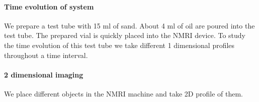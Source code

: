 \paragraph{Time evolution of system}
We prepare a test tube with 15 ml of sand. About 4 ml of oil are poured into the test tube. The prepared vial is quickly placed into the NMRI device. To study the time evolution of this test tube we take different 1 dimensional profiles throughout a time interval. 
\paragraph{2 dimensional imaging}
We place different objects in the NMRI machine and take 2D profile of them. 

